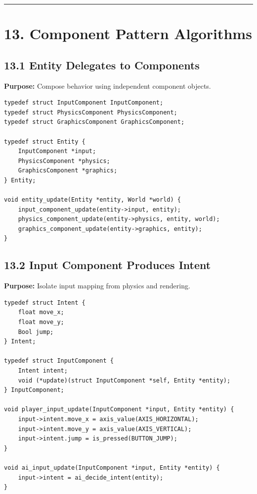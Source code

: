 \documentclass[10pt,letterpaper]{article}
\begin{document}
\medskip\hrule\medskip

\clearpage
\section{13. Component Pattern Algorithms}

\subsection{13.1 Entity Delegates to Components}

\textbf{Purpose:} Compose behavior using independent component objects.

\begin{verbatim}
typedef struct InputComponent InputComponent;
typedef struct PhysicsComponent PhysicsComponent;
typedef struct GraphicsComponent GraphicsComponent;

typedef struct Entity {
    InputComponent *input;
    PhysicsComponent *physics;
    GraphicsComponent *graphics;
} Entity;

void entity_update(Entity *entity, World *world) {
    input_component_update(entity->input, entity);
    physics_component_update(entity->physics, entity, world);
    graphics_component_update(entity->graphics, entity);
}
\end{verbatim}

\subsection{13.2 Input Component Produces Intent}

\textbf{Purpose:} Isolate input mapping from physics and rendering.

\begin{verbatim}
typedef struct Intent {
    float move_x;
    float move_y;
    Bool jump;
} Intent;

typedef struct InputComponent {
    Intent intent;
    void (*update)(struct InputComponent *self, Entity *entity);
} InputComponent;

void player_input_update(InputComponent *input, Entity *entity) {
    input->intent.move_x = axis_value(AXIS_HORIZONTAL);
    input->intent.move_y = axis_value(AXIS_VERTICAL);
    input->intent.jump = is_pressed(BUTTON_JUMP);
}

void ai_input_update(InputComponent *input, Entity *entity) {
    input->intent = ai_decide_intent(entity);
}
\end{verbatim}
\end{document}

